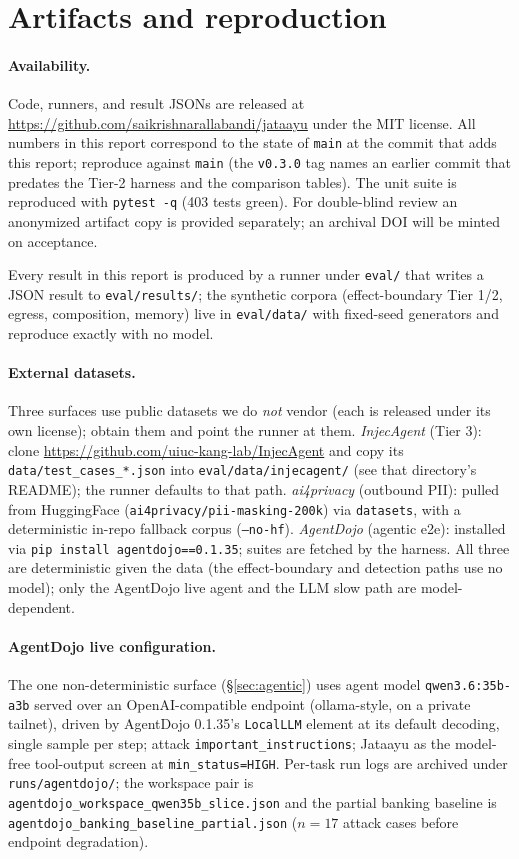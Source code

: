 \documentclass[11pt]{article}
\newcommand{\code}[1]{\texttt{\small #1}}
\begin{document}
\appendix
\section{Artifacts and reproduction}
\sloppy
\paragraph{Availability.} Code, runners, and result JSONs are released at
\url{https://github.com/saikrishnarallabandi/jataayu} under the MIT license. All numbers in this
report correspond to the state of \texttt{main} at the commit that adds this report; reproduce
against \texttt{main} (the \texttt{v0.3.0} tag names an earlier commit that predates the Tier-2
harness and the comparison tables). The unit suite is reproduced with \code{pytest -q} (403 tests
green). For double-blind review an anonymized artifact copy is provided separately; an archival DOI
will be minted on acceptance.

Every result in this report is produced by a runner under \code{eval/} that writes a JSON result
to \code{eval/results/}; the synthetic corpora (effect-boundary Tier 1/2, egress, composition,
memory) live in \code{eval/data/} with fixed-seed generators and reproduce exactly with no model.

\paragraph{External datasets.} Three surfaces use public datasets we do \emph{not} vendor (each is
released under its own license); obtain them and point the runner at them.
\emph{InjecAgent} (Tier 3): clone \url{https://github.com/uiuc-kang-lab/InjecAgent} and copy its
\code{data/test\_cases\_*.json} into \code{eval/data/injecagent/} (see that directory's README);
the runner defaults to that path. \emph{ai4privacy} (outbound PII): pulled from HuggingFace
(\code{ai4privacy/pii-masking-200k}) via \code{datasets}, with a deterministic in-repo fallback
corpus (\code{--no-hf}). \emph{AgentDojo} (agentic e2e): installed via \code{pip install
agentdojo==0.1.35}; suites are fetched by the harness. All three are deterministic given the data
(the effect-boundary and detection paths use no model); only the AgentDojo live agent and the LLM
slow path are model-dependent.

\paragraph{AgentDojo live configuration.} The one non-deterministic surface (\S\ref{sec:agentic}) uses agent model
\code{qwen3.6:35b-a3b} served over an OpenAI-compatible endpoint (ollama-style, on a private
tailnet), driven by AgentDojo 0.1.35's \code{LocalLLM} element at its default decoding, single
sample per step; attack \code{important\_instructions}; Jataayu as the model-free tool-output screen
at \code{min\_status=HIGH}. Per-task run logs are archived under \code{runs/agentdojo/}; the
workspace pair is \code{agentdojo\_workspace\_qwen35b\_slice.json} and the partial banking baseline
is \code{agentdojo\_banking\_baseline\_partial.json} ($n{=}17$ attack cases before endpoint
degradation).
\end{document}
